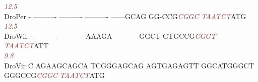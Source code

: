 \documentclass[11pt,twoside,reqno,a4paper]{article}
\begin{document}
{\hspace*{7\charwidth}\hspace*{1\charwidth}\hspace*{1\charwidth}\hspace*{1\charwidth}\hspace*{1\charwidth}\hspace*{1\charwidth}\hspace*{47\charwidth}\textit{\textcolor{Brown}{12.5}}\hspace*{1\charwidth}\\
DroPer	-	----------	----------	----------	------GCAG	GG-CCG\textit{\textcolor{Brown}{C}}\textit{\textcolor{Brown}{G}}\textit{\textcolor{Brown}{G}}\textit{\textcolor{Brown}{C}}	\textit{\textcolor{Brown}{T}}\textit{\textcolor{Brown}{A}}\textit{\textcolor{Brown}{A}}\textit{\textcolor{Brown}{T}}\textit{\textcolor{Brown}{C}}\textit{\textcolor{Brown}{T}}ATG\\
\hspace*{7\charwidth}\hspace*{1\charwidth}\hspace*{1\charwidth}\hspace*{1\charwidth}\hspace*{1\charwidth}\hspace*{1\charwidth}\hspace*{47\charwidth}\textit{\textcolor{Brown}{12.5}}\hspace*{1\charwidth}\\
DroWil	-	----------	----------	AAAGA-----	------GGCT	GTGCCG\textit{\textcolor{Brown}{C}}\textit{\textcolor{Brown}{G}}\textit{\textcolor{Brown}{G}}\textit{\textcolor{Brown}{T}}	\textit{\textcolor{Brown}{T}}\textit{\textcolor{Brown}{A}}\textit{\textcolor{Brown}{A}}\textit{\textcolor{Brown}{T}}\textit{\textcolor{Brown}{C}}\textit{\textcolor{Brown}{T}}ATT\\
\hspace*{7\charwidth}\hspace*{1\charwidth}\hspace*{1\charwidth}\hspace*{1\charwidth}\hspace*{1\charwidth}\hspace*{1\charwidth}\hspace*{47\charwidth}\textit{\textcolor{Brown}{9.8}}\hspace*{1\charwidth}\\
DroVir	C	AGAAGCAGCA	TCGGGAGCAG	AGTGAGAGTT	GGCATGGGCT	GGGCCG\textit{\textcolor{Brown}{C}}\textit{\textcolor{Brown}{G}}\textit{\textcolor{Brown}{G}}\textit{\textcolor{Brown}{C}}	\textit{\textcolor{Brown}{T}}\textit{\textcolor{Brown}{A}}\textit{\textcolor{Brown}{A}}\textit{\textcolor{Brown}{T}}\textit{\textcolor{Brown}{C}}\textit{\textcolor{Brown}{T}}ATG\\
}
\end{document}
